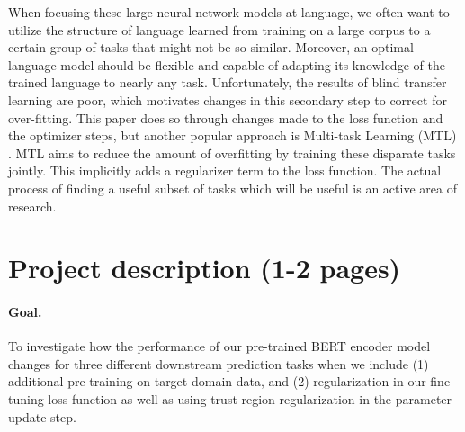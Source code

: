 \documentclass{article}
\begin{document}
When focusing these large neural network models at language, we often want to utilize the structure of language learned from training on a large corpus to a certain group of tasks that might not be so similar. Moreover, an optimal language model should be flexible and capable of adapting its knowledge of the trained language to nearly any task. Unfortunately, the results of blind transfer learning are poor, which motivates changes in this secondary step to correct for over-fitting. This paper does so through changes made to the loss function and the optimizer steps, but another popular approach is Multi-task Learning (MTL) \cite{MTL}. MTL aims to reduce the amount of overfitting by training these disparate tasks jointly. This implicitly adds a regularizer term to the loss function. The actual process of finding a useful subset of tasks which will be useful is an active area of research. 


\section{Project description (1-2 pages)}

\paragraph{Goal.} 
To investigate how the performance of our pre-trained BERT encoder model changes for three different downstream prediction tasks when we include (1) additional pre-training on target-domain data, and (2) regularization in our fine-tuning loss function as well as using trust-region regularization in the parameter update step.

\end{document}

